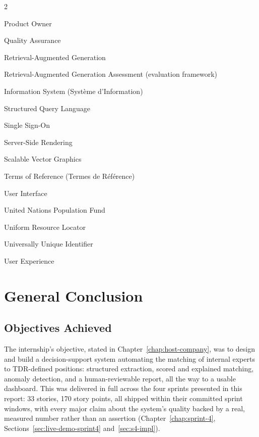 \documentclass[12pt,a4paper]{report}
\begin{document}
\begin{multicols}{2}
\begin{description}[itemsep=2pt]
  \item[PO] Product Owner
  \item[QA] Quality Assurance
  \item[RAG] Retrieval-Augmented Generation
  \item[RAGAS] Retrieval-Augmented Generation Assessment (evaluation
    framework)
  \item[SI] Information System (Syst\`eme d'Information)
  \item[SQL] Structured Query Language
  \item[SSO] Single Sign-On
  \item[SSR] Server-Side Rendering
  \item[SVG] Scalable Vector Graphics
  \item[TDR] Terms of Reference (Termes de R\'ef\'erence)
  \item[UI] User Interface
  \item[UNFPA] United Nations Population Fund
  \item[URL] Uniform Resource Locator
  \item[UUID] Universally Unique Identifier
  \item[UX] User Experience
\end{description}
\end{multicols}

\clearpage
{}
\pagestyle{fancy}









\chapter*{General Conclusion}

\section*{Objectives Achieved}

The internship's objective, stated in Chapter~\ref{chap:host-company}, was
to design and build a decision-support system automating the matching of
internal experts to TDR-defined positions: structured extraction,
scored and explained matching, anomaly detection, and a human-reviewable
report, all the way to a usable dashboard. This was delivered in full
across the four sprints presented in this report: 33 stories, 170 story
points, all shipped within their committed sprint windows, with every
major claim about the system's quality backed by a real, measured number
rather than an assertion (Chapter~\ref{chap:sprint-4},
Sections~\ref{sec:live-demo-sprint4} and~\ref{sec:s4-impl}).
\end{document}
